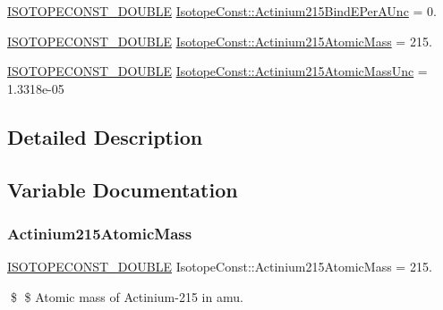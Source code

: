 \begin{DoxyCompactItemize}
\mbox{\hyperlink{group___isotope_const-_macros_ga8f45a7272ce02c0b4c65c44636ed719a}{I\+S\+O\+T\+O\+P\+E\+C\+O\+N\+S\+T\+\_\+\+D\+O\+U\+B\+LE}} \mbox{\hyperlink{group___isotope_const-_actinium-_ac215_ga84ff5f947dbacc1e471152d46ccb7a0b}{Isotope\+Const\+::\+Actinium215\+Bind\+E\+Per\+A\+Unc}} = 0.
\item 
\mbox{\hyperlink{group___isotope_const-_macros_ga8f45a7272ce02c0b4c65c44636ed719a}{I\+S\+O\+T\+O\+P\+E\+C\+O\+N\+S\+T\+\_\+\+D\+O\+U\+B\+LE}} \mbox{\hyperlink{group___isotope_const-_actinium-_ac215_ga6eb4ef4906ea685766edbb2dbd104c64}{Isotope\+Const\+::\+Actinium215\+Atomic\+Mass}} = 215.
\item 
\mbox{\hyperlink{group___isotope_const-_macros_ga8f45a7272ce02c0b4c65c44636ed719a}{I\+S\+O\+T\+O\+P\+E\+C\+O\+N\+S\+T\+\_\+\+D\+O\+U\+B\+LE}} \mbox{\hyperlink{group___isotope_const-_actinium-_ac215_ga8085d5343da5a03c1b789fc0771cf44e}{Isotope\+Const\+::\+Actinium215\+Atomic\+Mass\+Unc}} = 1.\+3318e-\/05
\end{DoxyCompactItemize}


\subsection{Detailed Description}


\subsection{Variable Documentation}
\mbox{\label{group___isotope_const-_actinium-_ac215_ga6eb4ef4906ea685766edbb2dbd104c64}} 
\subsubsection{\texorpdfstring{Actinium215\+Atomic\+Mass}{Actinium215AtomicMass}}
{\footnotesize\ttfamily \mbox{\hyperlink{group___isotope_const-_macros_ga8f45a7272ce02c0b4c65c44636ed719a}{I\+S\+O\+T\+O\+P\+E\+C\+O\+N\+S\+T\+\_\+\+D\+O\+U\+B\+LE}} Isotope\+Const\+::\+Actinium215\+Atomic\+Mass = 215.}

\$ \$ Atomic mass of Actinium-\/215 in amu. \mbox{\label{group___isotope_const-_actinium-_ac215_ga8085d5343da5a03c1b789fc0771cf44e}} 
